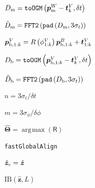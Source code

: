 \documentclass[10pt,journal,twocolumn]{IEEEtran} %
\newcommand{\vbh}[1]{\hat{\boldsymbol{#1}}}
\newcommand{\vbc}[1]{\check{\boldsymbol{#1}}}
\DeclareMathOperator*{\argmax}{\arg\!\max}
\begin{document}
\begin{algorithm}
  \footnotesize
  \vspace{0.25em}
  \Output{$\widehat{\bm{\Theta}}$}

  \vspace{1em}

  $D_{\text m} = \texttt{toOGM} \left( \bm{p}_{\text m}^W - \bm{t}_k^{V}, \delta t \right)$

  $\tilde{D}_{\text m} = \texttt{FFT2} \left( \texttt{pad} \left( D_{\text m}, 3\sigma_t \right) \right)$

  \vspace{1em}

  $\bm{p}_{{\text b, } 1:k}^{V} = R \left( \phi_{1:k}^{V} \right) \bm{p}_{{\text b, } 1:k}^B + \bm{t}_{1:k}^{V}$

  $D_{\text b} = \texttt{toOGM} \left( \bm{p}_{{\text b, } 1:k}^{V} - \bm{t}_k^{V}, \delta t \right)$

  $\tilde{D}_{\text b} = \texttt{FFT2} \left( \texttt{pad} \left( D_{\text b}, 3\sigma_t \right) \right)$

  \vspace{1em}

  $n = 3\sigma_t / \delta t$

  $m = 3\sigma_\phi / \delta \phi$

  $\widehat{\bm{\Theta}} = \argmax \left( \mathsf{R} \right)$

  \caption{\texttt{fastGlobalAlign}}
  \label{algo:correlation-search}
\end{algorithm}


\begin{algorithm}
\Input{$\vbh{z} \in \mathbb{R}^m$, $L \in \mathbb{R}^{m \times m}$}
\Output{$\vbc{z} \in \mathbb{Z}^m$}
$\vbh{z}_{\text c} = \vbh{z}$

\caption{${\text{IB}}( \vbh{z}, L)$}
\label{algo:second-algo}
\end{algorithm}
\noindent
\end{document}
